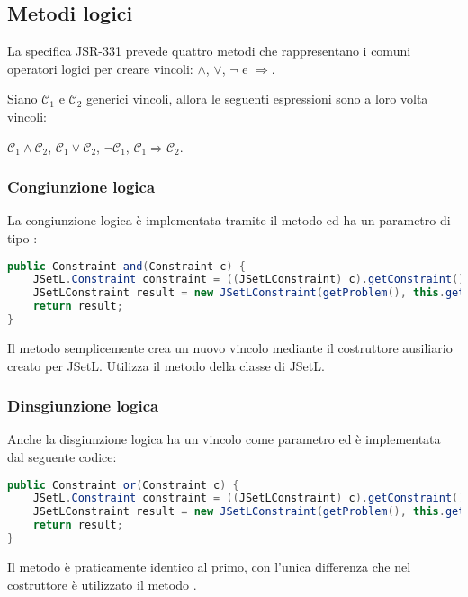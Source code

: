 \subsection{Metodi logici}
La specifica JSR-331 prevede quattro metodi che rappresentano i comuni
operatori logici per creare vincoli: $\wedge$, $\vee$, $\neg$ e $\Rightarrow$.

Siano $\mathcal{C}_1$ e $\mathcal{C}_2$ generici vincoli, allora le seguenti
espressioni sono a loro volta vincoli:
\begin{center}
$\mathcal{C}_1 \wedge \mathcal{C}_2$,\quad
$\mathcal{C}_1 \vee \mathcal{C}_2$, \quad
$\neg \mathcal{C}_1$, \quad
$\mathcal{C}_1 \Rightarrow \mathcal{C}_2$.
\end{center}

\subsubsection{Congiunzione logica}
La congiunzione logica è implementata tramite il metodo  ed ha un
parametro di tipo :
\begin{lstlisting}[language = Java,
                   caption = {\files{and}.}]
public Constraint and(Constraint c) {
	JSetL.Constraint constraint = ((JSetLConstraint) c).getConstraint();
	JSetLConstraint result = new JSetLConstraint(getProblem(), this.getConstraint().and(constraint));
	return result;
}
\end{lstlisting}
Il metodo semplicemente crea un nuovo vincolo mediante il costruttore ausiliario
creato per JSetL. Utilizza il metodo  della classe
 di JSetL.

\subsubsection{Dinsgiunzione logica}
Anche la disgiunzione logica ha un vincolo come parametro ed è implementata 
dal seguente codice: 
\begin{lstlisting}[language = Java,
                   caption = {\files{or}.}]
public Constraint or(Constraint c) {
	JSetL.Constraint constraint = ((JSetLConstraint) c).getConstraint();
	JSetLConstraint result = new JSetLConstraint(getProblem(), this.getConstraint().orTest(constraint));
	return result;		
}
\end{lstlisting}
Il metodo è praticamente identico al primo, con l'unica differenza che nel
costruttore è utilizzato il metodo . 

